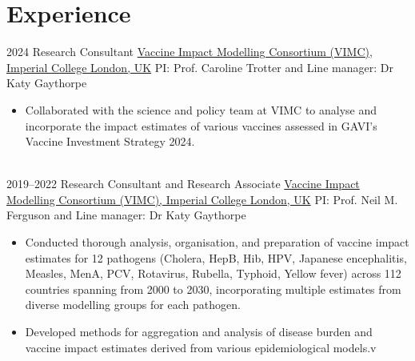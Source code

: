 \documentclass[ a4paper]{twentysecondcv} %
\begin{document}
\makeprofile %


\section{Experience}

\begin{twenty} %

 \twentyitem
    	{2024}
		{}
        {Research Consultant}
	{\href{https://www.vaccineimpact.org/}{Vaccine Impact Modelling Consortium (VIMC), Imperial College London, UK}{ PI: Prof. Caroline Trotter  and Line manager: Dr Katy Gaythorpe}}
         {}
         {\begin{itemize}
          \item Collaborated with the science and policy team at VIMC to analyse and incorporate the impact estimates of various vaccines assessed in GAVI's Vaccine Investment Strategy 2024.
         \end{itemize}}
         \\

 \twentyitem
    	{2019--2022}
		{}
        {Research Consultant and Research Associate}
        {\href{https://www.vaccineimpact.org/}{Vaccine Impact Modelling Consortium (VIMC), Imperial College London, UK}{ PI: Prof. Neil M. Ferguson and Line manager: Dr Katy Gaythorpe}}
         {}
         {\begin{itemize}
	\item Conducted thorough analysis, organisation, and preparation of vaccine impact estimates for 12 pathogens (Cholera, HepB, Hib, HPV, Japanese encephalitis, Measles, MenA, PCV, Rotavirus, Rubella, Typhoid, Yellow fever) across 112 countries spanning from 2000 to 2030, incorporating multiple estimates from diverse modelling groups for each pathogen.
	\item Developed methods for aggregation and analysis of disease burden and vaccine impact estimates derived from various epidemiological models.v
	\end{itemize}}
         \\



\end{twenty}
\end{document}
